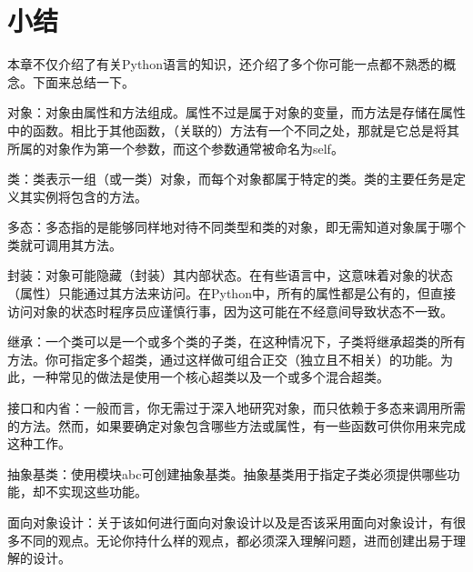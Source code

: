 \section{小结}
本章不仅介绍了有关Python语言的知识，还介绍了多个你可能一点都不熟悉的概念。下面来总结一下。
\begin{dinglist}{43}
    \item 对象：对象由属性和方法组成。属性不过是属于对象的变量，而方法是存储在属性中的函数。相比于其他函数，（关联的）方法有一个不同之处，那就是它总是将其所属的对象作为第一个参数，而这个参数通常被命名为self。
    \item 类：类表示一组（或一类）对象，而每个对象都属于特定的类。类的主要任务是定义其实例将包含的方法。
    \item 多态：多态指的是能够同样地对待不同类型和类的对象，即无需知道对象属于哪个类就可调用其方法。
    \item  封装：对象可能隐藏（封装）其内部状态。在有些语言中，这意味着对象的状态（属性）只能通过其方法来访问。在Python中，所有的属性都是公有的，但直接访问对象的状态时程序员应谨慎行事，因为这可能在不经意间导致状态不一致。
    \item  继承：一个类可以是一个或多个类的子类，在这种情况下，子类将继承超类的所有方法。你可指定多个超类，通过这样做可组合正交（独立且不相关）的功能。为此，一种常见的做法是使用一个核心超类以及一个或多个混合超类。
    \item  接口和内省：一般而言，你无需过于深入地研究对象，而只依赖于多态来调用所需的方法。然而，如果要确定对象包含哪些方法或属性，有一些函数可供你用来完成这种工作。
    \item  抽象基类：使用模块abc可创建抽象基类。抽象基类用于指定子类必须提供哪些功能，却不实现这些功能。
    \item  面向对象设计：关于该如何进行面向对象设计以及是否该采用面向对象设计，有很多不同的观点。无论你持什么样的观点，都必须深入理解问题，进而创建出易于理解的设计。
\end{dinglist}